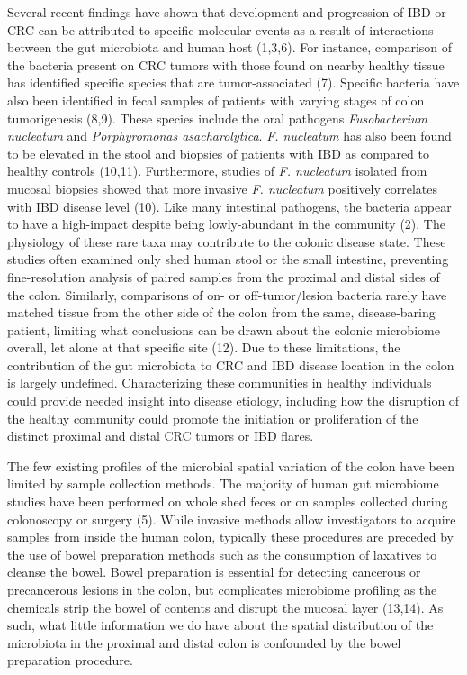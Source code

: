 \documentclass[12pt,]{article}
\begin{document}
Several recent findings have shown that development and progression of
IBD or CRC can be attributed to specific molecular events as a result of
interactions between the gut microbiota and human host (1,3,6). For
instance, comparison of the bacteria present on CRC tumors with those
found on nearby healthy tissue has identified specific species that are
tumor-associated (7). Specific bacteria have also been identified in
fecal samples of patients with varying stages of colon tumorigenesis
(8,9). These species include the oral pathogens \emph{Fusobacterium
nucleatum} and \emph{Porphyromonas asacharolytica}. \emph{F. nucleatum}
has also been found to be elevated in the stool and biopsies of patients
with IBD as compared to healthy controls (10,11). Furthermore, studies
of \emph{F. nucleatum} isolated from mucosal biopsies showed that more
invasive \emph{F. nucleatum} positively correlates with IBD disease
level (10). Like many intestinal pathogens, the bacteria appear to have
a high-impact despite being lowly-abundant in the community (2). The
physiology of these rare taxa may contribute to the colonic disease
state. These studies often examined only shed human stool or the small
intestine, preventing fine-resolution analysis of paired samples from
the proximal and distal sides of the colon. Similarly, comparisons of
on- or off-tumor/lesion bacteria rarely have matched tissue from the
other side of the colon from the same, disease-baring patient, limiting
what conclusions can be drawn about the colonic microbiome overall, let
alone at that specific site (12). Due to these limitations, the
contribution of the gut microbiota to CRC and IBD disease location in
the colon is largely undefined. Characterizing these communities in
healthy individuals could provide needed insight into disease etiology,
including how the disruption of the healthy community could promote the
initiation or proliferation of the distinct proximal and distal CRC
tumors or IBD flares.

The few existing profiles of the microbial spatial variation of the
colon have been limited by sample collection methods. The majority of
human gut microbiome studies have been performed on whole shed feces or
on samples collected during colonoscopy or surgery (5). While invasive
methods allow investigators to acquire samples from inside the human
colon, typically these procedures are preceded by the use of bowel
preparation methods such as the consumption of laxatives to cleanse the
bowel. Bowel preparation is essential for detecting cancerous or
precancerous lesions in the colon, but complicates microbiome profiling
as the chemicals strip the bowel of contents and disrupt the mucosal
layer (13,14). As such, what little information we do have about the
spatial distribution of the microbiota in the proximal and distal colon
is confounded by the bowel preparation procedure.
\end{document}
